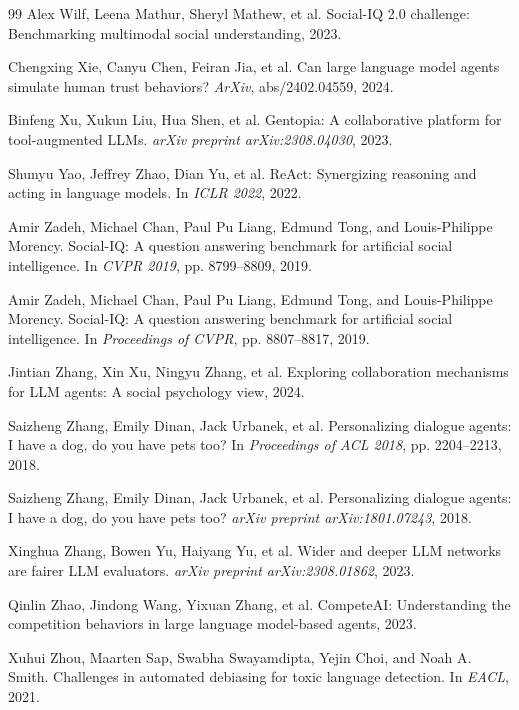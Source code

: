 \documentclass[11pt,a4paper]{article}
\begin{document}
\begin{thebibliography}{99}
Alex Wilf, Leena Mathur, Sheryl Mathew, et al. Social-IQ 2.0 challenge: Benchmarking multimodal social understanding, 2023.

Chengxing Xie, Canyu Chen, Feiran Jia, et al. Can large language model agents simulate human trust behaviors? \textit{ArXiv}, abs/2402.04559, 2024.

Binfeng Xu, Xukun Liu, Hua Shen, et al. Gentopia: A collaborative platform for tool-augmented LLMs. \textit{arXiv preprint arXiv:2308.04030}, 2023.

Shunyu Yao, Jeffrey Zhao, Dian Yu, et al. ReAct: Synergizing reasoning and acting in language models. In \textit{ICLR 2022}, 2022.

Amir Zadeh, Michael Chan, Paul Pu Liang, Edmund Tong, and Louis-Philippe Morency. Social-IQ: A question answering benchmark for artificial social intelligence. In \textit{CVPR 2019}, pp. 8799--8809, 2019.

Amir Zadeh, Michael Chan, Paul Pu Liang, Edmund Tong, and Louis-Philippe Morency. Social-IQ: A question answering benchmark for artificial social intelligence. In \textit{Proceedings of CVPR}, pp. 8807--8817, 2019.

Jintian Zhang, Xin Xu, Ningyu Zhang, et al. Exploring collaboration mechanisms for LLM agents: A social psychology view, 2024.

Saizheng Zhang, Emily Dinan, Jack Urbanek, et al. Personalizing dialogue agents: I have a dog, do you have pets too? In \textit{Proceedings of ACL 2018}, pp. 2204--2213, 2018.

Saizheng Zhang, Emily Dinan, Jack Urbanek, et al. Personalizing dialogue agents: I have a dog, do you have pets too? \textit{arXiv preprint arXiv:1801.07243}, 2018.

Xinghua Zhang, Bowen Yu, Haiyang Yu, et al. Wider and deeper LLM networks are fairer LLM evaluators. \textit{arXiv preprint arXiv:2308.01862}, 2023.

Qinlin Zhao, Jindong Wang, Yixuan Zhang, et al. CompeteAI: Understanding the competition behaviors in large language model-based agents, 2023.

Xuhui Zhou, Maarten Sap, Swabha Swayamdipta, Yejin Choi, and Noah A. Smith. Challenges in automated debiasing for toxic language detection. In \textit{EACL}, 2021.


\end{thebibliography}
\end{document}
